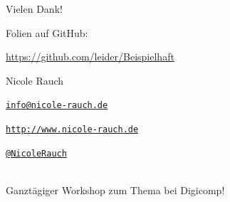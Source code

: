 {
\begin{frame}{}

\begin{center}
\Large
Vielen Dank!
\end{center}

        Folien auf GitHub:
        \vspace{-0.8em}
        \begin{center}
                \url{https://github.com/leider/Beispielhaft}
        \end{center}

        \begin{block}{Nicole Rauch}
        \begin{description}[Twitterxx]
                \item[E-Mail]  \href{mailto:info@nicole-rauch.de}{\texttt{info@nicole-rauch.de}}
                \item[WWW]  \href{http://www.nicole-rauch.de}{\texttt{http://www.nicole-rauch.de}}
                \item[Twitter] \href{http://twitter.com/NicoleRauch}{\texttt{@NicoleRauch}}
        \end{description}
        \end{block}
        
        ~\\
        
        Ganztägiger Workshop zum Thema bei Digicomp!
        
\end{frame}
}

%
%
